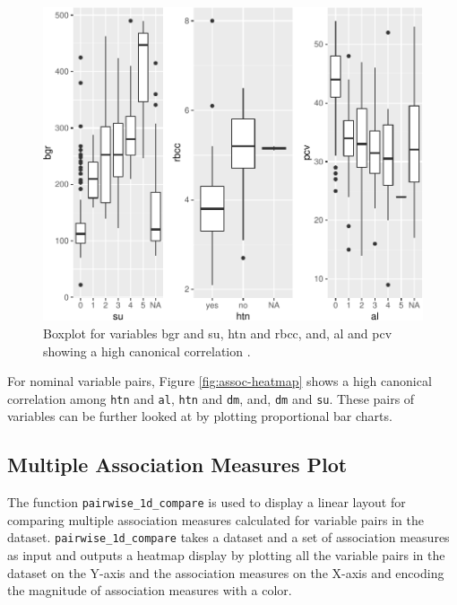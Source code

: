 \begin{Schunk}
\begin{figure}

{\centering \includegraphics{rj_paper_files/figure-latex/mixed_pairs-1} 

}

\caption[Boxplot for variables bgr and su, htn and rbcc, and, al and pcv showing a high canonical correlation ]{Boxplot for variables bgr and su, htn and rbcc, and, al and pcv showing a high canonical correlation . }\label{fig:mixed_pairs}
\end{figure}
\end{Schunk}

For nominal variable pairs, Figure \ref{fig:assoc-heatmap} shows a high
canonical correlation among \texttt{htn} and \texttt{al}, \texttt{htn}
and \texttt{dm}, and, \texttt{dm} and \texttt{su}. These pairs of
variables can be further looked at by plotting proportional bar charts.

\hypertarget{multiple-association-measures-plot}{%
\subsection{Multiple Association Measures
Plot}\label{multiple-association-measures-plot}}

The function \texttt{pairwise\_1d\_compare} is used to display a linear
layout for comparing multiple association measures calculated for
variable pairs in the dataset. \texttt{pairwise\_1d\_compare} takes a
dataset and a set of association measures as input and outputs a heatmap
display by plotting all the variable pairs in the dataset on the Y-axis
and the association measures on the X-axis and encoding the magnitude of
association measures with a color.

